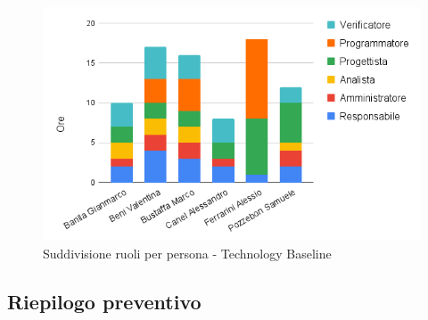 \begin{figure}[h!]
	\centering
	\includegraphics[scale=0.46]{../../assets/Diagrammi_Excel/person_tec.png}
	\caption{Suddivisione ruoli per persona - Technology Baseline}
\end{figure}
\newpage

\subsection{Riepilogo preventivo}

